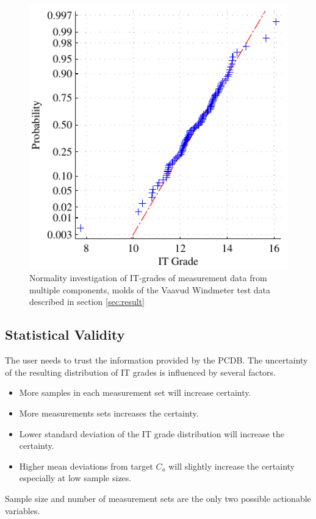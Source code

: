 \documentclass[aip,amsmath, reprint, author-year]{revtex4-1}
\begin{document}
\begin{figure}
\includegraphics{Normal_plot.pdf}
\caption{\label{fig:normplot} Normality investigation of IT-grades of measurement data from multiple components, molds of the Vaavud Windmeter test data described in section \ref{sec:result}}
\end{figure}





\subsection{Statistical Validity}
The user needs to trust the information provided by the PCDB. 
The uncertainty of the resulting distribution of IT grades is influenced by several factors.
\begin{itemize}
\item More samples in each measurement set will increase certainty. 
\item More measurements sets increases the certainty. 
\item Lower standard deviation of the IT grade distribution will increase the certainty.
\item Higher mean deviations from target $C_a$ will slightly increase the certainty especially at low sample sizes.
\end{itemize}
Sample size and number of measurement sets are the only two possible actionable variables. 
\end{document}
